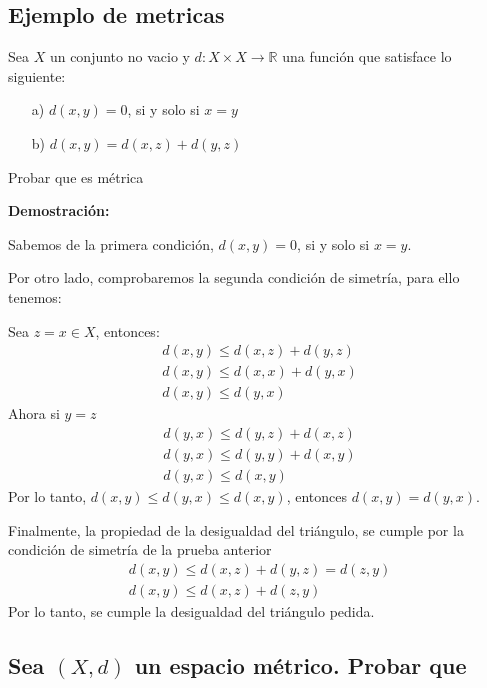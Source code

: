 \documentclass[
]{article}
\begin{document}
\hypertarget{ejemplo-de-metricas}{%
\subsection{Ejemplo de metricas}\label{ejemplo-de-metricas}}

Sea \(X\) un conjunto no vacio y
\(d: X \times X \longrightarrow \mathbb{R}\) una función que satisface
lo siguiente:

\begin{itemize}
\item [a)] $d(x,y)=0$, si y solo si $x=y$
\item [b)] $d(x,y)= d(x,z)+d(y,z)$
\end{itemize}

Probar que es métrica

\textbf{Demostración:}

Sabemos de la primera condición, \(d(x,y)=0\), si y solo si \(x=y\).

Por otro lado, comprobaremos la segunda condición de simetría, para ello
tenemos:

Sea \(z=x \in X\), entonces: \begin{eqnarray*}
d(x,y) \leq  d(x,z) + d(y,z)\\
d(x,y) \leq  d(x,x) + d(y,x)\\
d(x,y) \leq  d(y,x)
\end{eqnarray*} Ahora si \(y=z\) \begin{eqnarray*}
d(y,x) \leq  d(y,z) + d(x,z)\\
d(y,x) \leq  d(y,y) + d(x,y)\\
d(y,x) \leq  d(x,y)
\end{eqnarray*} Por lo tanto, \(d(x,y) \leq d(y,x) \leq d(x,y)\),
entonces \(d(x,y)= d(y,x)\).

Finalmente, la propiedad de la desigualdad del triángulo, se cumple por
la condición de simetría de la prueba anterior \begin{eqnarray*}
d(x,y) \leq  d(x,z) + d(y,z)=d(z,y)\\
d(x,y) \leq  d(x,z) + d(z,y)
\end{eqnarray*} Por lo tanto, se cumple la desigualdad del triángulo
pedida.

\hypertarget{sea-xd-un-espacio-muxe9trico.-probar-que}{%
\subsection{\texorpdfstring{Sea \((X,d)\) un espacio métrico. Probar
que}{Sea (X,d) un espacio métrico. Probar que}}\label{sea-xd-un-espacio-muxe9trico.-probar-que}}
\end{document}

